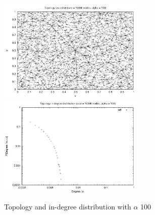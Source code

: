 \documentclass[a4paper,11pt]{article}
\begin{document}
\begin{figure}
\begin{center}
\includegraphics[width=7cm]{pic_alfa100}\hfill
\includegraphics[width=7cm]{picdegree_alfa100}
\end{center}
\caption{Topology and in-degree distribution
with $\alpha$ 100\label{t100figure}}
\end{figure}

%
\end{document}
